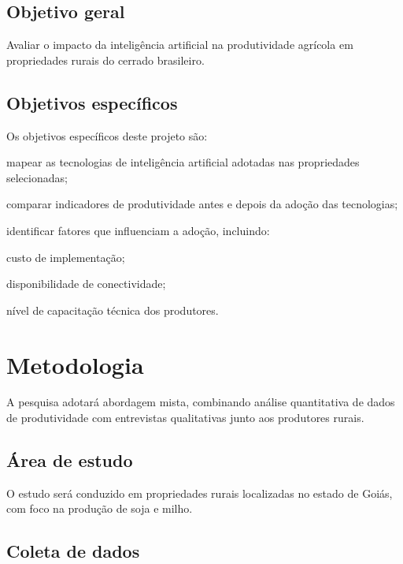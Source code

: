 \documentclass{abnt-projeto-pesquisa}
\begin{document}
\section{Objetivo geral}

Avaliar o impacto da inteligência artificial na produtividade agrícola
em propriedades rurais do cerrado brasileiro.

\section{Objetivos específicos}

Os objetivos específicos deste projeto são:

\begin{alineas}
  \item mapear as tecnologias de inteligência artificial adotadas
    nas propriedades selecionadas;
  \item comparar indicadores de produtividade antes e depois da
    adoção das tecnologias;
  \item identificar fatores que influenciam a adoção, incluindo:
    \begin{subalineas}
      \item custo de implementação;
      \item disponibilidade de conectividade;
      \item nível de capacitação técnica dos produtores.
    \end{subalineas}
\end{alineas}

\chapter{Metodologia}

A pesquisa adotará abordagem mista, combinando análise quantitativa de
dados de produtividade com entrevistas qualitativas junto aos produtores
rurais.

\section{Área de estudo}

O estudo será conduzido em propriedades rurais localizadas no estado de
Goiás, com foco na produção de soja e milho.

\section{Coleta de dados}
\end{document}
